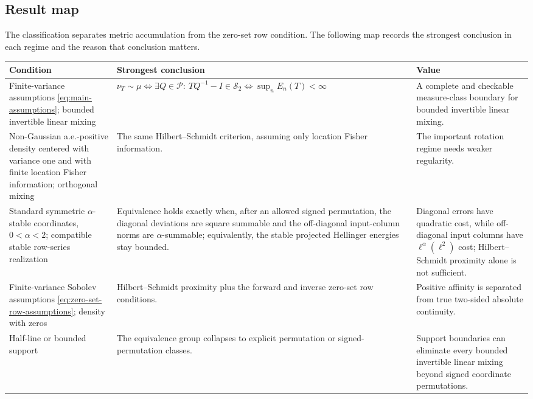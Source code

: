 \subsection{Result map}
\label{sec:result-map}

The classification separates metric accumulation from the zero-set row
condition.
The following map records the strongest conclusion in each regime and the
reason that conclusion matters.

\begin{center}
\renewcommand{\arraystretch}{1.22}
\begin{tabular}{
  >{\raggedright\arraybackslash}p{}
  >{\raggedright\arraybackslash}p{}
  >{\raggedright\arraybackslash}p{}}
\toprule
\textbf{Condition} & \textbf{Strongest conclusion} & \textbf{Value}\\
\midrule
Finite-variance assumptions \eqref{eq:main-assumptions}; bounded invertible
linear mixing
&
\(\nu_T\sim\mu\Longleftrightarrow
\exists Q\in\mathcal P:\ TQ^{-1}-I\in\mathcal S_2
\Longleftrightarrow \sup_nE_n(T)<\infty\)
&
A complete and checkable measure-class boundary for bounded invertible linear mixing.\\
Non-Gaussian a.e.-positive density centered with variance one and with finite
location Fisher information; orthogonal mixing
&
The same Hilbert--Schmidt criterion, assuming only location Fisher
information.
&
The important rotation regime needs weaker regularity.\\
Standard symmetric \(\alpha\)-stable coordinates, \(0<\alpha<2\);
compatible stable row-series realization
&
Equivalence holds exactly when, after an allowed signed permutation, the
diagonal deviations are square summable and the off-diagonal input-column
norms are \(\alpha\)-summable; equivalently, the stable projected Hellinger
energies stay bounded.
&
Diagonal errors have quadratic cost, while off-diagonal input columns have
\(\ell^\alpha(\ell^2)\) cost; Hilbert--Schmidt proximity alone is not
sufficient.\\
Finite-variance Sobolev assumptions
\eqref{eq:zero-set-row-assumptions}; density
with zeros
&
Hilbert--Schmidt proximity plus the forward and inverse zero-set row
conditions.
&
Positive affinity is separated from true two-sided absolute continuity.\\
Half-line or bounded support
&
The equivalence group collapses to explicit permutation or
signed-permutation classes.
&
Support boundaries can eliminate every bounded invertible linear mixing
beyond signed coordinate permutations.\\
\bottomrule
\end{tabular}
\end{center}

